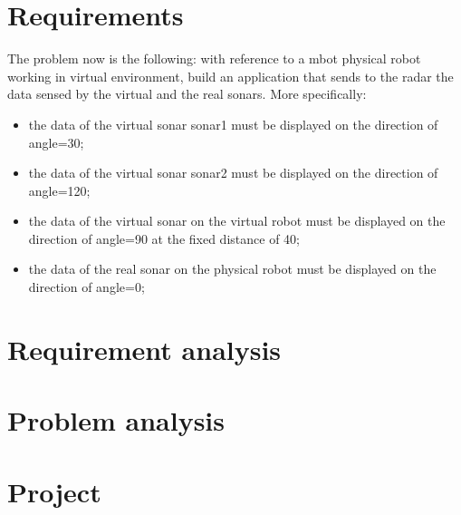 \documentclass{llncs}
\newcommand{\labelsec}[1]{\label{sec:#1}}
\begin{document}
\section{Requirements}
The problem now is the following:
with reference to a mbot physical robot working in virtual environment, build an application that sends to the
radar the data sensed by the virtual and the real sonars. More specifically:
\begin{itemize}
\item the data of the virtual sonar sonar1 must be displayed on the direction of angle=30;
\item the data of the virtual sonar sonar2 must be displayed on the direction of angle=120;
\item the data of the virtual sonar on the virtual robot must be displayed on the direction of angle=90 at the fixed
distance of 40;
\item the data of the real sonar on the physical robot must be displayed on the direction of angle=0;
\end{itemize}
\labelsec{Requirements}

\section{Requirement analysis}
\labelsec{ReqAnalysis}
 

\section{Problem analysis}
\labelsec{ProblemAnalysis}


\section{Project}
\labelsec{Project}


\end{document}
